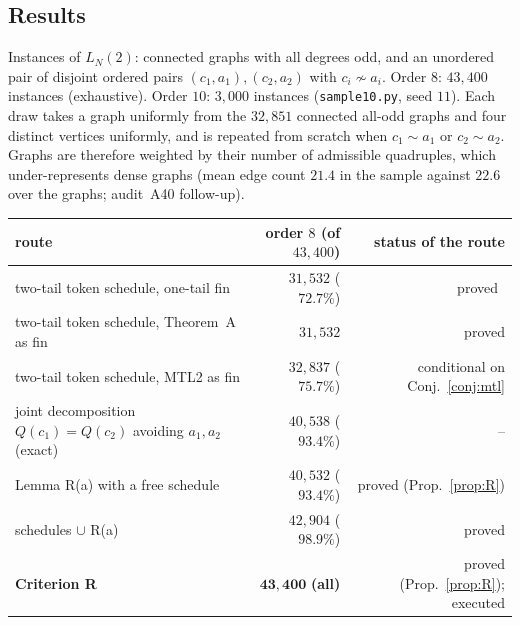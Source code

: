 \documentclass[11pt]{amsart}
\theoremstyle{definition}
\begin{document}
\subsection*{Results}
Instances of $L_N(2)$: connected graphs with all degrees odd, and an unordered pair of disjoint
ordered pairs $(c_1,a_1),(c_2,a_2)$ with $c_i\not\sim a_i$. Order $8$: $43{,}400$ instances
(exhaustive). Order $10$: $3{,}000$ instances (\texttt{sample10.py}, seed $11$). Each draw takes a
graph uniformly from the $32{,}851$ connected all-odd graphs and four distinct vertices uniformly,
and is repeated from scratch when $c_1\sim a_1$ or $c_2\sim a_2$. Graphs are therefore weighted by
their number of admissible quadruples, which under-represents dense graphs (mean edge count $21.4$
in the sample against $22.6$ over the graphs; audit~A40 follow-up).

\begin{center}\footnotesize
\begin{tabular}{@{}lrr@{}}
\toprule
route & order $8$ (of $43{,}400$) & status of the route\\
\midrule
two-tail token schedule, one-tail fin~\cite{MT} & $31{,}532$ ($72.7\%$) & proved~\cite{MT}\\
two-tail token schedule, Theorem~A as fin & $31{,}532$ & proved\\
two-tail token schedule, MTL2 as fin & $32{,}837$ ($75.7\%$) & conditional on Conj.~\ref{conj:mtl}\\
joint decomposition $Q(c_1)=Q(c_2)$ avoiding $a_1,a_2$ (exact) & $40{,}538$ ($93.4\%$) & --\\
Lemma R(a) with a free schedule & $40{,}532$ ($93.4\%$) & proved (Prop.~\ref{prop:R})\\
schedules $\cup$ R(a) & $42{,}904$ ($98.9\%$) & proved\\
\textbf{Criterion R} & $\mathbf{43{,}400}$ \textbf{(all)} & proved (Prop.~\ref{prop:R}); executed\\
\bottomrule
\end{tabular}
\end{center}
\end{document}
